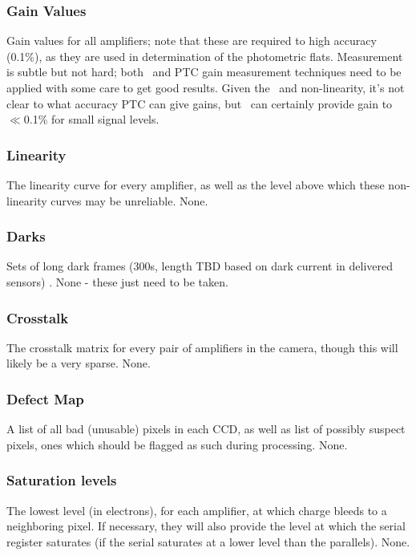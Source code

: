 \subsubsection{Gain Values}\label{sec:CPP:inputs:gain} 
\cameraTeam
Gain values for all amplifiers; note that these are required to high accuracy (0.1\%), as they are used in determination of the photometric flats.
\alg Measurement is subtle but not hard; both \fefiftyfive\ and PTC gain measurement techniques need to be applied with some care to get good results. Given the \bfeffect\ and non-linearity, it's not clear to what accuracy PTC can give gains, but \fefiftyfive\ can certainly provide gain to $\ll$0.1\% for small signal levels.


\subsubsection{Linearity}\label{sec:CPP:inputs:linearityCurve} 
\cameraTeam
The linearity curve for every amplifier, as well as the level above which these non-linearity curves may be unreliable.
\alg None.


\subsubsection{Darks}\label{sec:CPP:inputs:dark}
Sets of long dark frames (\smalltilde 300s, length TBD based on dark current in delivered sensors) .
\alg None - these just need to be taken.


\subsubsection{Crosstalk}\label{sec:CPP:inputs:crosstalk}
\cameraTeam
The crosstalk matrix for every pair of amplifiers in the camera, though this will likely be a very sparse.
\alg None.


\subsubsection{Defect Map}\label{sec:CPP:inputs:defectList} 
\cameraTeam
A list of all bad (unusable) pixels in each CCD, as well as list of possibly suspect pixels, \ie ones which should be flagged as such during processing.
\alg None.


\subsubsection{Saturation levels}\label{sec:CPP:inputs:saturationLevel}
\cameraTeam
The lowest level (in electrons), for each amplifier, at which charge bleeds to a neighboring pixel. If necessary, they will also provide the level at which the serial register saturates (\ie if the serial saturates at a lower level than the parallels).
\alg None.


